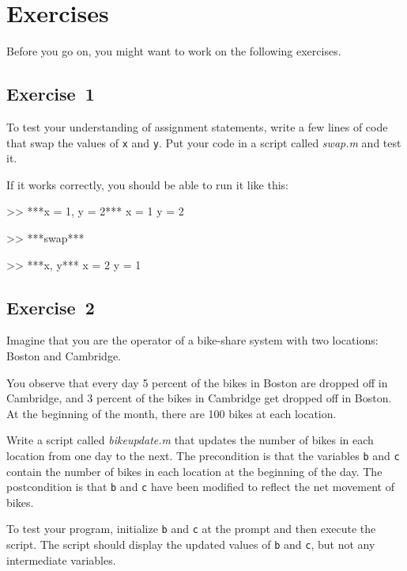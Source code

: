 \section{Exercises}

Before you go on, you might want to work on the following exercises.

\subsection{Exercise~1}
To test your understanding of assignment statements, write a few lines of code that swap the values of \lstinline{x} and \lstinline{y}. 
Put your code in a script called \emph{swap.m} and test it.

If it works correctly, you should be able to run it like this:

\begin{code}
>> ***x = 1, y = 2***
x = 1
y = 2

>> ***swap***

>> ***x, y***
x = 2
y = 1
\end{code}





\subsection{Exercise~2}
\label{bikegame}

Imagine that you are the operator of a bike-share system with two
locations: Boston and Cambridge.

You observe that every day 5 percent
of the bikes in Boston are dropped off in Cambridge, and 3 percent of the bikes
in Cambridge get dropped off in Boston.
At the beginning of the month, there are 100 bikes at each location.

Write a script called \emph{bike\textunderscore update.m} that updates the number
of bikes in each location from one day to the next.  The precondition
is that the variables \lstinline{b} and \lstinline{c} contain the number of bikes
in each location at the beginning of the day.  The postcondition
is that \lstinline{b} and \lstinline{c} have been modified to reflect the net movement of bikes.

To test your program, initialize \lstinline{b} and \lstinline{c} at
the prompt and then execute the script.  The script should display
the updated values of \lstinline{b} and \lstinline{c}, but not any intermediate
variables.

